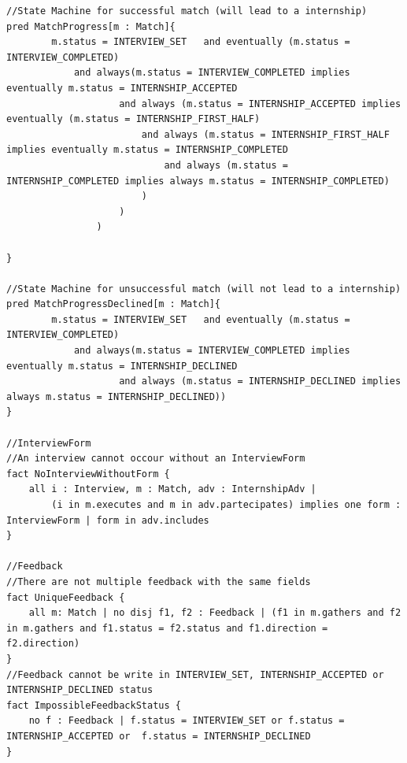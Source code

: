 \begin{lstlisting}
//State Machine for successful match (will lead to a internship)
pred MatchProgress[m : Match]{
		m.status = INTERVIEW_SET   and eventually (m.status = INTERVIEW_COMPLETED)
			and always(m.status = INTERVIEW_COMPLETED implies eventually m.status = INTERNSHIP_ACCEPTED
					and always (m.status = INTERNSHIP_ACCEPTED implies eventually (m.status = INTERNSHIP_FIRST_HALF)
						and always (m.status = INTERNSHIP_FIRST_HALF implies eventually m.status = INTERNSHIP_COMPLETED
							and always (m.status = INTERNSHIP_COMPLETED implies always m.status = INTERNSHIP_COMPLETED)
						)
					)
				)
		
}

//State Machine for unsuccessful match (will not lead to a internship)
pred MatchProgressDeclined[m : Match]{
		m.status = INTERVIEW_SET   and eventually (m.status = INTERVIEW_COMPLETED)
			and always(m.status = INTERVIEW_COMPLETED implies eventually m.status = INTERNSHIP_DECLINED
					and always (m.status = INTERNSHIP_DECLINED implies always m.status = INTERNSHIP_DECLINED))
}

//InterviewForm
//An interview cannot occour without an InterviewForm
fact NoInterviewWithoutForm {
	all i : Interview, m : Match, adv : InternshipAdv |
		(i in m.executes and m in adv.partecipates) implies one form : InterviewForm | form in adv.includes 
}

//Feedback
//There are not multiple feedback with the same fields
fact UniqueFeedback {
	all m: Match | no disj f1, f2 : Feedback | (f1 in m.gathers and f2 in m.gathers and f1.status = f2.status and f1.direction = f2.direction)
}
//Feedback cannot be write in INTERVIEW_SET, INTERNSHIP_ACCEPTED or INTERNSHIP_DECLINED status
fact ImpossibleFeedbackStatus {
	no f : Feedback | f.status = INTERVIEW_SET or f.status = INTERNSHIP_ACCEPTED or  f.status = INTERNSHIP_DECLINED
}


\end{lstlisting}
